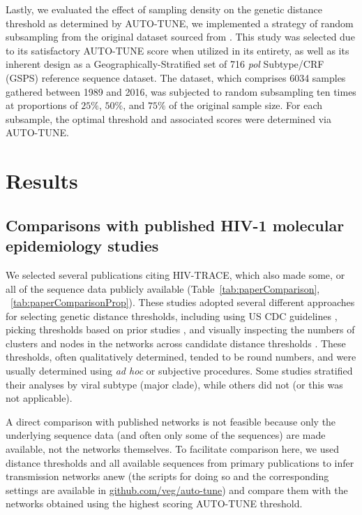 \documentclass[utf8]{FrontiersinHarvard} %
\newcommand{\TODO}[1]{{\color{red}{#1}}}
\begin{document}
Lastly, we evaluated the effect of sampling density on the genetic distance
threshold as determined by AUTO-TUNE, we implemented a strategy of random
subsampling from the original dataset sourced from \citep{rhee_national_2019}.
This study was selected due to its satisfactory AUTO-TUNE score when utilized
in its entirety, as well as its inherent design as a Geographically-Stratified
set of 716 \textit{pol} Subtype/CRF (GSPS) reference sequence dataset. The dataset,
which comprises 6034 samples gathered between 1989 and 2016, was subjected to
random subsampling ten times at proportions of $25\%$, $50\%$, and $75\%$ of
the original sample size. For each subsample, the optimal threshold and
associated scores were determined via AUTO-TUNE.

\section{Results}

\subsection{Comparisons with published HIV-1 molecular epidemiology studies}

\TODO {JOW : Explain why you selected them first. }

We selected several publications citing HIV-TRACE, which also made some, or all
of the sequence data publicly available (Table~\ref{tab:paperComparison},
~\ref{tab:paperComparisonProp}). These studies adopted several different
approaches for selecting genetic distance thresholds, including using US CDC
guidelines \citep{yan_central_2020}, picking thresholds based on prior studies
\citep{sivay_hiv-1_2018}, and visually inspecting the numbers of clusters and
nodes in the networks across candidate distance thresholds
\citep{liu_dynamics_2020}. These thresholds, often qualitatively determined,
tended to be round numbers, and were usually determined using {\it ad hoc} or
subjective procedures. Some studies stratified their analyses by viral subtype
(major clade), while others did not (or this was not applicable).

A direct comparison with published networks is not feasible because only the
underlying sequence data (and often only some of the sequences) are made
available, not the networks themselves. To facilitate comparison here, we used
distance thresholds and all available sequences from primary publications to
infer transmission networks anew (the scripts for doing so and the
corresponding settings are available in \url{github.com/veg/auto-tune}) and
compare them with the networks obtained using the highest scoring AUTO-TUNE
threshold.
\end{document}
